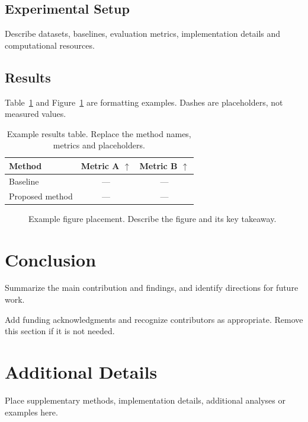 \documentclass{article}
\begin{document}
\subsection{Experimental Setup}
Describe datasets, baselines, evaluation metrics, implementation details
and computational resources.

\subsection{Results}
Table~\ref{tab:results} and Figure~\ref{fig:example} are formatting examples.
Dashes are placeholders, not measured values.

\begin{table}[htbp]
  \caption{Example results table. Replace the method names, metrics and placeholders.}
  \label{tab:results}
  \centering
  \begin{tabular}{lcc}
    \toprule
    Method & Metric A $\uparrow$ & Metric B $\uparrow$ \\
    \midrule
    Baseline        & --- & --- \\
    Proposed method & --- & --- \\
    \bottomrule
  \end{tabular}
\end{table}

\begin{figure}[htbp]
  \centering
  \caption{Example figure placement. Describe the figure and its key takeaway.}
  \label{fig:example}
\end{figure}

\section{Conclusion}
Summarize the main contribution and findings, and identify directions for
future work.

\begin{ack}
Add funding acknowledgments and recognize contributors as appropriate.
Remove this section if it is not needed.
\end{ack}




\appendix
\section{Additional Details}
\label{sec:appendix}
Place supplementary methods, implementation details, additional analyses
or examples here.
\end{document}
